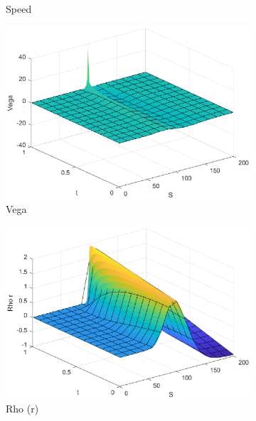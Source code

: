 \begin{figure}[H]
\begin{subfigure}[b]{0.35\linewidth}
        \caption{Speed}
    \end{subfigure}
    \begin{subfigure}[b]{0.35\linewidth}
        \includegraphics[width=\linewidth]{Imagenes/Parte1/6_Sols/Binary_Call/Binary_Call_Vega.eps}
        \caption{Vega}
    \end{subfigure}
    \begin{subfigure}[b]{0.35\linewidth}
        \includegraphics[width=\linewidth]{Imagenes/Parte1/6_Sols/Binary_Call/Binary_Call_Rho_r.eps}
        \caption{Rho (r)}
    \end{subfigure}
    \begin{subfigure}[b]{0.35\linewidth}

\end{subfigure}
\end{figure}
